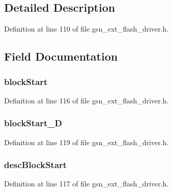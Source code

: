 \subsection{Detailed Description}


Definition at line 110 of file gsn\_\-ext\_\-flash\_\-driver.h.



\subsection{Field Documentation}
\hypertarget{a00071_a2f24f2d703080ebae9767dd0cf410be0}{
\subsubsection[{blockStart}]{ {\bf blockStart}}}
\label{a00071_a2f24f2d703080ebae9767dd0cf410be0}


Definition at line 116 of file gsn\_\-ext\_\-flash\_\-driver.h.

\hypertarget{a00071_ae4cf7019e5663b5821bf7d808e3b468a}{
\subsubsection[{blockStart\_\-D}]{ {\bf blockStart\_\-D}}}
\label{a00071_ae4cf7019e5663b5821bf7d808e3b468a}


Definition at line 119 of file gsn\_\-ext\_\-flash\_\-driver.h.

\hypertarget{a00071_a6f4dea133385a9141fa7080de63b65aa}{
\subsubsection[{descBlockStart}]{ {\bf descBlockStart}}}
\label{a00071_a6f4dea133385a9141fa7080de63b65aa}


Definition at line 117 of file gsn\_\-ext\_\-flash\_\-driver.h.


